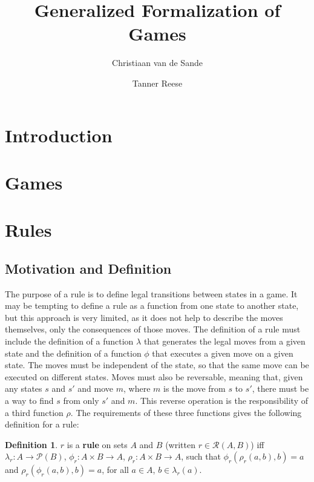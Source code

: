 \documentclass{article}
\title{Generalized Formalization of Games}
\author{Christiaan van de Sande \and Tanner Reese}
\theoremstyle{definition}
\newtheorem{definition}{Definition}[subsection]
\theoremstyle{plain}
\def\rule{\mathcal{R}}
\begin{document}
\maketitle

\section{Introduction}

\section{Games}

\section{Rules}

\subsection{Motivation and Definition} %

The purpose of a rule is to define legal transitions between states in a game.
It may be tempting to define a rule as a function from one state to another state,
but this approach is very limited,
as it does not help to describe the moves themselves,
only the consequences of those moves.
The definition of a rule must include
the definition of a function $ \lambda $ that generates the legal moves from a given state
and the definition of a function $ \phi $ that executes a given move on a given state.
The moves must be independent of the state, so that the same move can be executed on different states.
Moves must also be reversable,
meaning that, given any states $ s $ and $ s' $ and move $ m $,
where $ m $ is the move from $ s $ to $ s' $,
there must be a way to find $ s $ from only $ s' $ and $ m $.
This reverse operation is the responsibility of a third function $ \rho $.
The requirements of these three functions gives the following definition for a rule:

 \begin{definition}
  $ r $ is a \textbf{rule} on sets $ A $ and $ B $ (written  $ r \in \rule (A, B) $) iff
  $ \lambda_r : A          \rightarrow \mathcal{P} (B) $,
  $    \phi_r : A \times B \rightarrow A $,
  $    \rho_r : A \times B \rightarrow A $,
  such that $ \phi_r (\rho_r (a, b), b) = a $
  and $ \rho_r (\phi_r (a, b), b) = a $,
  for all $ a \in A $, $ b \in \lambda_r (a) $.
\end{definition}
\end{document}
